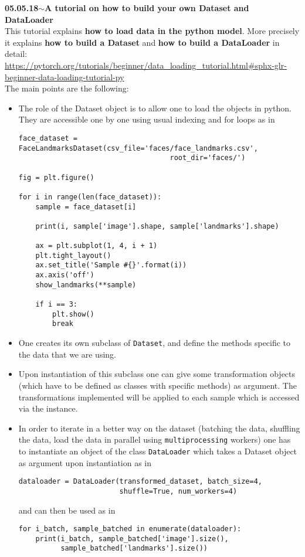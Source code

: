 \documentclass[11pt,a4paper]{article}
\newenvironment{loggentry}[2]%
{\noindent\textbf{#1}\hspace{1cm}$\mathbf{\sim}$\text{ }\textbf{#2}\\}{\vspace{0.5cm}}
\begin{document}
\begin{loggentry}{05.05.18}{A tutorial on how to build your own Dataset and DataLoader}
This tutorial explains \textbf{how to load data in the python model}. More precisely it explains \textbf{how to build a Dataset} and \textbf{how to build a DataLoader} in detail:\\
\url{https://pytorch.org/tutorials/beginner/data_loading_tutorial.html#sphx-glr-beginner-data-loading-tutorial-py}\\
The main points are the following:\\
\begin{itemize}
\item The role of the Dataset object is to allow one to load the objects in python. They are accessible one by one using usual indexing and for loops as in
\begin{verbatim}
face_dataset = FaceLandmarksDataset(csv_file='faces/face_landmarks.csv',
                                    root_dir='faces/')

fig = plt.figure()

for i in range(len(face_dataset)):
    sample = face_dataset[i]

    print(i, sample['image'].shape, sample['landmarks'].shape)

    ax = plt.subplot(1, 4, i + 1)
    plt.tight_layout()
    ax.set_title('Sample #{}'.format(i))
    ax.axis('off')
    show_landmarks(**sample)

    if i == 3:
        plt.show()
        break
\end{verbatim}
\item One creates its own subclass of \texttt{Dataset}, and define the methods specific to the data that we are using.
\item Upon instantiation of this subclass one can give some transformation objects (which have to be defined as classes with specific methods) as argument. The transformations implemented will be applied to each sample which is accessed via the instance.
\item In order to iterate in a better way on the dataset (batching the data, shuffling the data, load the data in parallel using \texttt{multiprocessing} workers) one has to instantiate an object of the class \texttt{DataLoader} which takes a Dataset object as argument upon instantiation as in
\begin{verbatim}
dataloader = DataLoader(transformed_dataset, batch_size=4,
                        shuffle=True, num_workers=4)
\end{verbatim}
and can then be used as in
\begin{verbatim}
for i_batch, sample_batched in enumerate(dataloader):
    print(i_batch, sample_batched['image'].size(),
          sample_batched['landmarks'].size())
\end{verbatim}
\end{itemize}

\end{loggentry}
\end{document}
